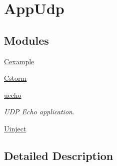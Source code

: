 \hypertarget{group___app_udp}{}\section{App\+Udp}
\label{group___app_udp}
\subsection*{Modules}
\begin{DoxyCompactItemize}
\item 
\hyperlink{group__cexample}{Cexample}
\item 
\hyperlink{group__cstorm}{Cstorm}
\item 
\hyperlink{group__uecho}{uecho}
\begin{DoxyCompactList}\small\item\em U\+DP Echo application. \end{DoxyCompactList}\item 
\hyperlink{group__uinject}{Uinject}
\end{DoxyCompactItemize}


\subsection{Detailed Description}
